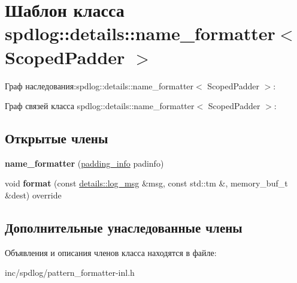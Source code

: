 \hypertarget{classspdlog_1_1details_1_1name__formatter}{}\section{Шаблон класса spdlog\+:\+:details\+:\+:name\+\_\+formatter$<$ Scoped\+Padder $>$}
\label{classspdlog_1_1details_1_1name__formatter}


Граф наследования\+:spdlog\+:\+:details\+:\+:name\+\_\+formatter$<$ Scoped\+Padder $>$\+:


Граф связей класса spdlog\+:\+:details\+:\+:name\+\_\+formatter$<$ Scoped\+Padder $>$\+:
\subsection*{Открытые члены}
\begin{DoxyCompactItemize}
\item 
\mbox{\label{classspdlog_1_1details_1_1name__formatter_afb6d743649ac7a915af5cc8d698b1847}} 
{\bfseries name\+\_\+formatter} (\hyperlink{structspdlog_1_1details_1_1padding__info}{padding\+\_\+info} padinfo)
\item 
\mbox{\label{classspdlog_1_1details_1_1name__formatter_a94ac8aa27ffe7833b15ba09eda3253dd}} 
void {\bfseries format} (const \hyperlink{structspdlog_1_1details_1_1log__msg}{details\+::log\+\_\+msg} \&msg, const std\+::tm \&, memory\+\_\+buf\+\_\+t \&dest) override
\end{DoxyCompactItemize}
\subsection*{Дополнительные унаследованные члены}


Объявления и описания членов класса находятся в файле\+:\begin{DoxyCompactItemize}
\item 
inc/spdlog/pattern\+\_\+formatter-\/inl.\+h\end{DoxyCompactItemize}
